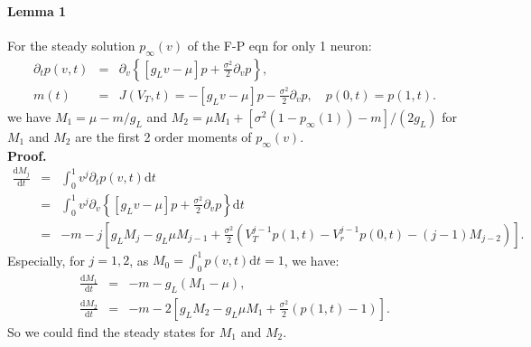 \documentclass[10pt]{article}
\begin{document}
\begin{multicols}{2}
\paragraph{Lemma 1} For the steady solution $p_{\infty}(v)$ of the F-P eqn for only 1 neuron:
\begin{eqnarray}
\label{FP1}
\partial_tp(v,t) &=&\partial_v\left\{ [g_Lv-\mu]p+\frac{\sigma^2}{2}\partial_vp \right\}, \\
m(t)&=&J(V_T,t)= -[g_Lv-\mu]p-\frac{\sigma^2}{2}\partial_vp, \quad p(0,t)=p(1,t).
\end{eqnarray}
we have $M_1=\mu-m/g_L$ and $M_2=\mu M_1+[\sigma^2(1-p_{\infty}(1))-m]/(2g_L)$ for $M_1$ and $M_2$ are the first 2 order moments of $p_{\infty}(v)$. \\
{\bf{Proof.}} 
\begin{eqnarray}
\frac{\mbox{d}M_j}{\mbox{d}t}&=&\int_0^1{v^j\partial_tp(v,t)\mbox{d}t} \nonumber\\
            &=&\int_0^1{v^j\partial_v\left\{ [g_Lv-\mu]p+\frac{\sigma^2}{2}\partial_vp \right\}\mbox{d}t} \nonumber\\
            &=& -m-j[g_LM_j-g_L\mu M_{j-1}+\frac{\sigma^2}{2}(V_T^{j-1}p(1,t)-V_r^{j-1}p(0,t)-(j-1)M_{j-2})]. \nonumber
\end{eqnarray}
\indent Especially, for $j=1,2$, as $M_0=\int_0^1{p(v,t)\mbox{d}t}=1$, we have:
\begin{eqnarray}
\frac{\mbox{d}M_1}{\mbox{d}t} &=& -m-g_L(M_1-\mu), \nonumber\\
\frac{\mbox{d}M_2}{\mbox{d}t} &=& -m-2[g_LM_2-g_L\mu M_1+\frac{\sigma^2}{2}(p(1,t)-1)]. \nonumber
\end{eqnarray}
So we could find the steady states for $M_1$ and $M_2$.


\end{multicols}
\end{document}
